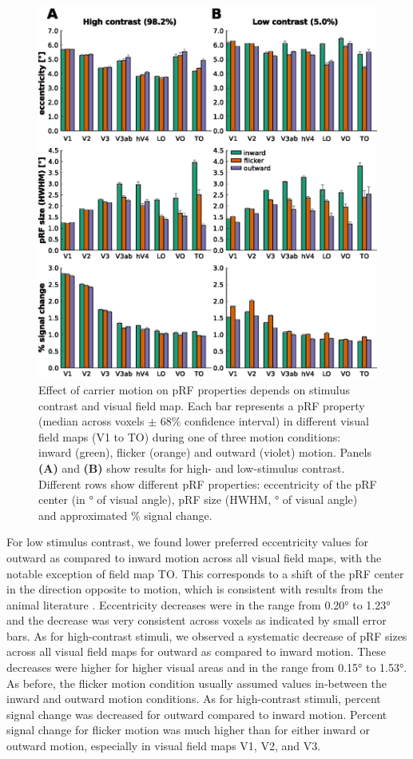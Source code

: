 \begin{figure}[htbp!]
\centering
\includegraphics[width=\textwidth]{figures/chapter_04/fig2a.eps}
\caption{Effect of carrier motion on pRF properties depends on stimulus contrast and visual field map. Each bar represents a pRF property (median across voxels $\pm$ 68\% confidence interval) in different visual field maps (V1 to TO) during one of three motion conditions: inward (green), flicker (orange) and outward (violet) motion. Panels \textbf{(A)} and \textbf{(B)} show results for high- and low-stimulus contrast. Different rows show different pRF properties: eccentricity of the pRF center (in ° of visual angle), pRF size (HWHM, ° of visual angle) and approximated \% signal change.}
\label{fig:effectPrf} 
\end{figure}

For low stimulus contrast, we found lower preferred eccentricity values for outward as compared to inward motion across all visual field maps, with the notable exception of field map TO. This corresponds to a shift of the pRF center in the direction opposite to motion, which is consistent with results from the animal literature \parencite{Fu2004, Sundberg2006}. Eccentricity decreases were in the range from 0.20° to 1.23° and the decrease was very consistent across voxels as indicated by small error bars. As for high-contrast stimuli, we observed a systematic decrease of pRF sizes across all visual field maps for outward as compared to inward motion. These decreases were higher for higher visual areas and in the range from 0.15° to 1.53°. As before, the flicker motion condition usually assumed values in-between the inward and outward motion conditions. As for high-contrast stimuli, percent signal change was decreased for outward compared to inward motion. Percent signal change for flicker motion was much higher than for either inward or outward motion, especially in visual field maps V1, V2, and V3.

